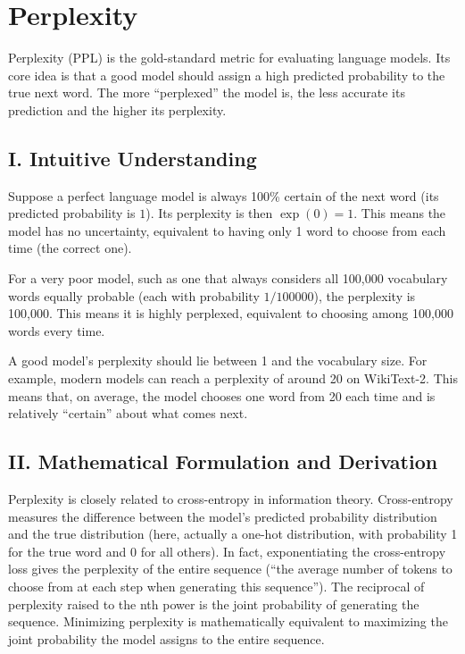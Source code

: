 \setcounter{section}{7}

\hypertarget{perplexity}{%
\section{Perplexity}\label{perplexity}}

Perplexity (PPL) is the gold-standard metric for evaluating language models. Its core idea is that a good model should assign a high predicted probability to the true next word. The more ``perplexed'' the model is, the less accurate its prediction and the higher its perplexity.

\hypertarget{i.-intuitive-understanding}{%
\subsection{I. Intuitive Understanding}\label{i.-intuitive-understanding}}

Suppose a perfect language model is always 100\% certain of the next word (its predicted probability is \(1\)). Its perplexity is then \(\exp(0)=1\). This means the model has no uncertainty, equivalent to having only 1 word to choose from each time (the correct one).

For a very poor model, such as one that always considers all 100,000 vocabulary words equally probable (each with probability \(1/100000\)), the perplexity is 100,000. This means it is highly perplexed, equivalent to choosing among 100,000 words every time.

A good model's perplexity should lie between 1 and the vocabulary size. For example, modern models can reach a perplexity of around 20 on WikiText-2. This means that, on average, the model chooses one word from 20 each time and is relatively ``certain'' about what comes next.

\hypertarget{ii.-mathematical-formulation-and-derivation}{%
\subsection{II. Mathematical Formulation and Derivation}\label{ii.-mathematical-formulation-and-derivation}}

Perplexity is closely related to cross-entropy in information theory. Cross-entropy measures the difference between the model's predicted probability distribution and the true distribution (here, actually a one-hot distribution, with probability 1 for the true word and 0 for all others). In fact, exponentiating the cross-entropy loss gives the perplexity of the entire sequence (``the average number of tokens to choose from at each step when generating this sequence''). The reciprocal of perplexity raised to the nth power is the joint probability of generating the sequence. Minimizing perplexity is mathematically equivalent to maximizing the joint probability the model assigns to the entire sequence.

